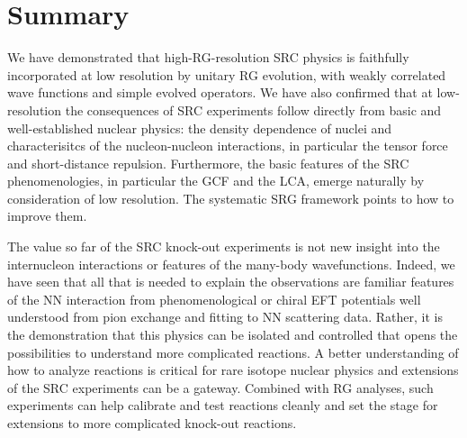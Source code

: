 \documentclass[10pt,aps,prc,floatfix,twocolumn,nofootinbib]{revtex4-1}
\begin{document}
\section{Summary} \label{sec:summary}

We have demonstrated that high-RG-resolution SRC physics is faithfully incorporated at low resolution by unitary RG evolution, with weakly correlated wave functions and simple evolved operators.
We have also confirmed that at low-resolution the consequences of SRC experiments follow directly from basic and well-established nuclear physics: the density dependence of nuclei and  characterisitcs of the nucleon-nucleon interactions, in particular the tensor force and short-distance repulsion.
Furthermore, the basic features of the SRC phenomenologies, in particular the GCF and the LCA, emerge naturally by consideration of low resolution. 
The systematic SRG framework points to how to improve them.
    
The value so far  of the SRC knock-out experiments is not new insight into the internucleon interactions or features of the many-body wavefunctions.
Indeed, we have seen that all that is needed to explain the observations are familiar features of the NN interaction from phenomenological or chiral EFT potentials well understood from pion exchange and fitting to NN scattering data.
Rather, it is the demonstration that this physics can be isolated and controlled that opens the possibilities to understand more complicated reactions.
A better understanding of how to analyze reactions is critical for rare isotope nuclear physics and extensions of the SRC experiments can be a gateway.
Combined with RG analyses, such experiments can help calibrate and test reactions cleanly and set the stage for extensions to more complicated knock-out reactions.
    
        
\end{document}

